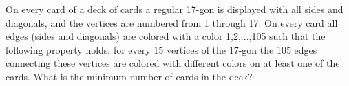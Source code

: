 On every card of a deck of cards a regular 17-gon is displayed with all sides and diagonals, and the vertices are numbered from 1 through 17. On every card all edges (sides and diagonals) are colored with a color 1,2,...,105 such that the following property holds: for every 15 vertices of the 17-gon the 105 edges connecting these vertices are colored with different colors on at least one of the cards. What is the minimum number of cards in the deck?